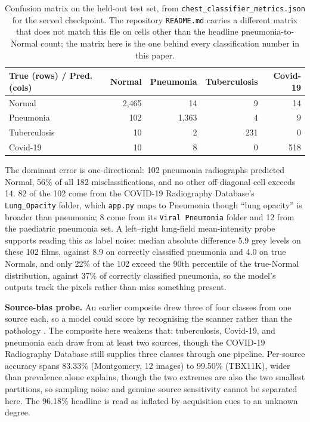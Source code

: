 \documentclass{article}
\begin{document}
\begin{table}[h]
\centering
\caption{Confusion matrix on the held-out test set, from \texttt{chest\_classifier\_metrics.json} for the served checkpoint. The repository \texttt{README.md} carries a different matrix that does not match this file on cells other than the headline pneumonia-to-Normal count; the matrix here is the one behind every classification number in this paper.}
\label{tab:confusion}
\begin{tabular}{lrrrr}
\toprule
True (rows) / Pred. (cols) & Normal & Pneumonia & Tuberculosis & Covid-19 \\
\midrule
Normal       & 2{,}465 & 14 & 9 & 14 \\
Pneumonia    & 102 & 1{,}363 & 4 & 9 \\
Tuberculosis & 10 & 2 & 231 & 0 \\
Covid-19     & 10 & 8 & 0 & 518 \\
\bottomrule
\end{tabular}
\end{table}

The dominant error is one-directional: 102 pneumonia radiographs predicted Normal, 56\% of all 182 misclassifications, and no other off-diagonal cell exceeds 14. 82 of the 102 come from the COVID-19 Radiography Database's \texttt{Lung\_Opacity} folder, which \texttt{app.py} maps to Pneumonia though ``lung opacity'' is broader than pneumonia; 8 come from its \texttt{Viral Pneumonia} folder and 12 from the paediatric pneumonia set. A left--right lung-field mean-intensity probe supports reading this as label noise: median absolute difference 5.9 grey levels on these 102 films, against 8.9 on correctly classified pneumonia and 4.0 on true Normals, and only 22\% of the 102 exceed the 90th percentile of the true-Normal distribution, against 37\% of correctly classified pneumonia, so the model's outputs track the pixels rather than miss something present.

\textbf{Source-bias probe.} An earlier composite drew three of four classes from one source each, so a model could score by recognising the scanner rather than the pathology \citep{zech2018variable}. The composite here weakens that: tuberculosis, Covid-19, and pneumonia each draw from at least two sources, though the COVID-19 Radiography Database still supplies three classes through one pipeline. Per-source accuracy spans 83.33\% (Montgomery, 12 images) to 99.50\% (TBX11K), wider than prevalence alone explains, though the two extremes are also the two smallest partitions, so sampling noise and genuine source sensitivity cannot be separated here. The 96.18\% headline is read as inflated by acquisition cues to an unknown degree.
\end{document}
